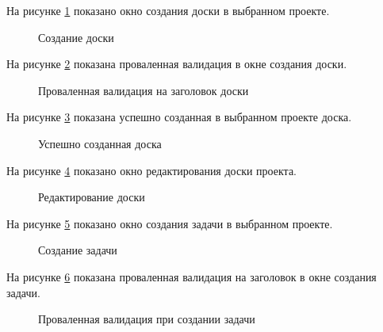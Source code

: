 На рисунке \ref{доска_создание:image} показано окно создания доски в выбранном проекте.
\begin{figure}[ht]
	\caption{Создание доски}
	\label{доска_создание:image}
\end{figure}

На рисунке \ref{доска_создание_некорректно:image} показана проваленная валидация в окне создания доски.
\begin{figure}[ht]
	\caption{Проваленная валидация на заголовок доски}
	\label{доска_создание_некорректно:image}
\end{figure}

На рисунке \ref{доска_создание_успешно:image} показана успешно созданная в выбранном проекте доска.
\begin{figure}[ht]
	\caption{Успешно созданная доска}
	\label{доска_создание_успешно:image}
\end{figure}


На рисунке \ref{доска_изменение:image} показано окно редактирования доски проекта.

\newpage

\begin{figure}[ht]
	\caption{Редактирование доски}
	\label{доска_изменение:image}
\end{figure}

На рисунке \ref{задача_создание:image} показано окно создания задачи в выбранном проекте.

\begin{figure}[ht]
	\caption{Создание задачи}
	\label{задача_создание:image}
\end{figure}

На рисунке \ref{задача_некорректно_заголовок:image} показана проваленная валидация на заголовок в окне создания задачи.

\newpage

\begin{figure}[ht]
	\caption{Проваленная валидация при создании задачи}
	\label{задача_некорректно_заголовок:image}
\end{figure}

